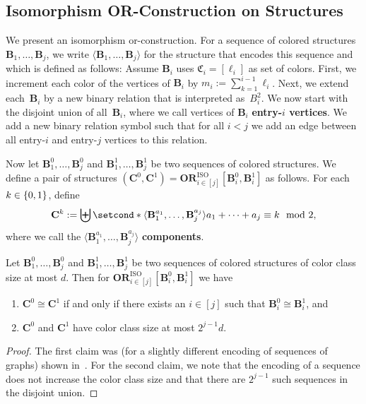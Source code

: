 \documentclass[a4paper,english, thm-restate]{lipics-v2021}
\newcommand{\defining}[1]{\textbf{#1}}
\newcommand{\iso}{\cong}
\newcommand{\bigdisunion}{\biguplus}
\DeclarePairedDelimiter\set{\lbrace}{\rbrace}
\newcommand{\StructB}{\mathbf{B}}
\newcommand{\StructC}{\mathbf{C}}
\newcommand{\colors}{\mathfrak{C}}
\newcommand{\ORISO}[2]{\mathbf{OR}^{\text{ISO}}_{#1}[#2]}
\begin{document}
	
	
	
	\subsection{Isomorphism OR-Construction on Structures}
	
	We present an isomorphism or-construction.
	For a sequence of colored structures $\StructB_1,\dots, \StructB_j$,
	we write $\langle \StructB_1, \dots, \StructB_j \rangle$
	for the structure that encodes this sequence and which is defined as follows:
	Assume $\StructB_i$ uses $\colors_i = [\ell_i]$ as set of colors.
	First, we increment each color of the vertices of $\StructB_i$ by $m_i := \sum_{k=1}^{i-1} \ell_i$.
	Next, we extend each~$\StructB_i$ by a new binary relation
	that is interpreted as~$B_i^2$.
	We now start with the disjoint union of all~$\StructB_i$,
	where we call vertices of $\StructB_i$ \defining{entry-$i$ vertices}.
	We add a new binary relation symbol
	such that for all $i <j$ we add an edge
	between all entry-$i$ and entry-$j$ vertices to this relation.
	
	
	Now let $\StructB_1^0, \dots, \StructB_j^0$ and $\StructB_1^1,\dots, \StructB_j^1$
	be two sequences of colored structures.
	We define a pair of structures $(\StructC^0, \StructC^1) = \ORISO{i\in[j]} {\StructB_i^0,\StructB_i^1}$ as follows.
	For each $k \in \set{0,1}$, define
	\[\StructC^k := \bigdisunion \setcond*{\langle \StructB_1^{a_1}, \dots, \StructB_j^{a_j} \rangle}{a_1+\dots+a_j \equiv k \mod 2},\]
	where we call the $\langle \StructB_1^{a_1}, \dots, \StructB_j^{a_j} \rangle$ \defining{components}.
	\begin{lemma}
		\label{lem:or-construction-basics}
		Let $\StructB_1^0, \dots, \StructB_j^0$ and $\StructB_1^1,\dots, \StructB_j^1$
		be two sequences of colored structures of color class size at most $d$.
		Then for $\ORISO{i\in[j]} {\StructB_i^0,\StructB_i^1}$ we have
		\begin{enumerate}
			\item $\StructC^0 \iso \StructC^1$ if and only if there exists an $i \in [j]$ such that $\StructB_i^0 \iso \StructB_i^1$, and
			\item $\StructC^0$ and $\StructC^1$ have color class size at most $2^{j-1}d$.
		\end{enumerate}
	\end{lemma}
	\begin{proof}
		The first claim was (for a slightly different encoding of sequences of graphs) shown in~\cite{BerkholzGrohe2017}.
		For the second claim, we note that the encoding of a sequence
		does not increase the color class size
		and that there are $2^{j-1}$ such sequences in the disjoint union.
	\end{proof}
	
\end{document}
